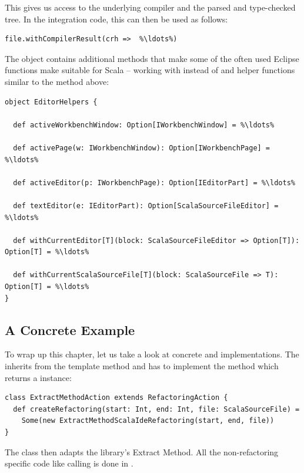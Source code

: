 \documentclass[10pt,a4paper,oneside]{scrreprt}
\begin{document}
This gives us access to the underlying compiler and the parsed and type-checked tree. In the integration code, this can then be used as follows:

\begin{lstlisting}
file.withCompilerResult(crh =>  %\ldots%)
\end{lstlisting}

The  object contains additional methods that make some of the often used Eclipse functions make suitable for Scala -- working with  instead of  and helper functions similar to the  method above:

\begin{lstlisting}
object EditorHelpers {

  def activeWorkbenchWindow: Option[IWorkbenchWindow] = %\ldots%

  def activePage(w: IWorkbenchWindow): Option[IWorkbenchPage] = %\ldots%

  def activeEditor(p: IWorkbenchPage): Option[IEditorPart] = %\ldots%

  def textEditor(e: IEditorPart): Option[ScalaSourceFileEditor] = %\ldots%

  def withCurrentEditor[T](block: ScalaSourceFileEditor => Option[T]): Option[T] = %\ldots%

  def withCurrentScalaSourceFile[T](block: ScalaSourceFile => T): Option[T] = %\ldots%
}
\end{lstlisting}

\subsection{A Concrete Example}

To wrap up this chapter, let us take a look at concrete  and  implementations. The  inherits from the  template method and has to implement the  method which returns a  instance:

\begin{lstlisting}
class ExtractMethodAction extends RefactoringAction {
  def createRefactoring(start: Int, end: Int, file: ScalaSourceFile) = 
    Some(new ExtractMethodScalaIdeRefactoring(start, end, file))
}
\end{lstlisting}

The  class then adapts the library's Extract Method. All the non-refactoring specific code like calling  is done in .
\end{document}
